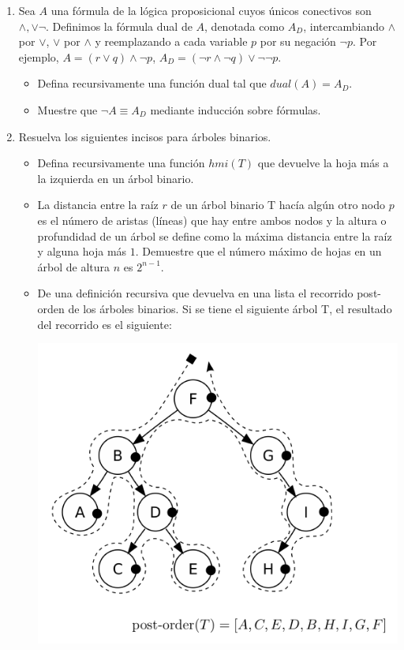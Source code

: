 \documentclass[letterpaper,11pt]{article}
\begin{document}
\begin{enumerate}
    \item Sea $A$ una fórmula de la lógica proposicional cuyos únicos 
    conectivos son $\land, \lor \neg$. Definimos la fórmula dual de $A$, 
    denotada como $A_{D}$, intercambiando $\land$ por $\lor$, $\lor$ por 
    $\land$ y reemplazando a cada variable $p$ por su negación $\neg p$.
    Por ejemplo, $A = (r \lor q) \land \neg p$, $A_{D} = (\neg r \land \neg q)
    \lor \neg \neg p$.
    \begin{itemize}
        \item Defina recursivamente una función dual tal que $dual(A) = A_{D}$.
        \item Muestre que $\neg A \equiv A_{D}$ mediante inducción sobre 
        fórmulas.
    \end{itemize}

    \item Resuelva los siguientes incisos para árboles binarios.
    \begin{itemize}
        \item Defina recursivamente una función $hmi(T)$ que devuelve la hoja
        más a la izquierda en un árbol binario.
        \item La distancia entre la raíz $r$ de un árbol binario T hacía algún
        otro nodo $p$ es el número de aristas (líneas) que hay entre ambos nodos
        y la altura o profundidad de un árbol se define como la máxima distancia
        entre la raíz y alguna hoja más $1$. Demuestre que el número máximo de 
        hojas en un árbol de altura $n$ es $2^{n - 1}$.
        \item De una definición recursiva que devuelva en una lista el recorrido
        post-orden de los árboles binarios. Si se tiene el siguiente árbol T, 
        el resultado del recorrido es el siguiente:
        \begin{center}
            \centerline{\includegraphics[scale=0.7]{recorrido.png}}
        \end{center}    
    \end{itemize}
\end{enumerate}
\end{document}
